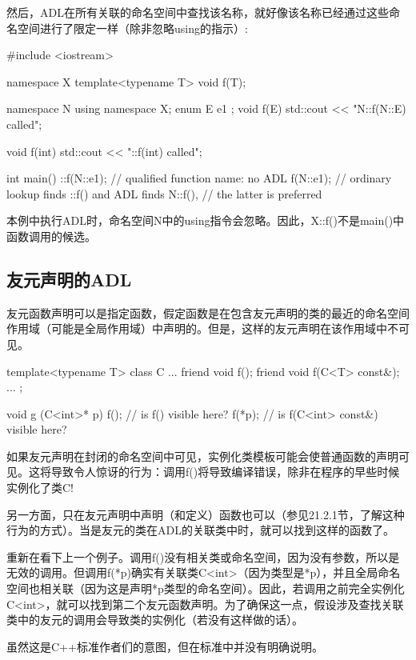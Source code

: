 然后，ADL在所有关联的命名空间中查找该名称，就好像该名称已经通过这些命名空间进行了限定一样（除非忽略using的指示）:

\begin{cpp}
#include <iostream>

namespace X {
	template<typename T> void f(T);
}

namespace N {
	using namespace X;
	enum E { e1 };
	void f(E) {
		std::cout << "N::f(N::E) called\n";
	}
}

void f(int)
{
	std::cout << "::f(int) called\n";
}

int main()
{
	::f(N::e1); // qualified function name: no ADL
	f(N::e1); // ordinary lookup finds ::f() and ADL finds N::f(),
} // the latter is preferred
\end{cpp}

本例中执行ADL时，命名空间N中的using指令会忽略。因此，X::f()不是main()中函数调用的候选。

\subsection{友元声明的ADL}

友元函数声明可以是指定函数，假定函数是在包含友元声明的类的最近的命名空间作用域（可能是全局作用域）中声明的。但是，这样的友元声明在该作用域中不可见。

\begin{cpp}
template<typename T>
class C {
	...
	friend void f();
	friend void f(C<T> const&);
	...
};

void g (C<int>* p)
{
	f(); // is f() visible here?
	f(*p); // is f(C<int> const&) visible here?
}
\end{cpp}

如果友元声明在封闭的命名空间中可见，实例化类模板可能会使普通函数的声明可见。这将导致令人惊讶的行为：调用f()将导致编译错误，除非在程序的早些时候实例化了类C!

另一方面，只在友元声明中声明（和定义）函数也可以（参见21.2.1节，了解这种行为的方式）。当是友元的类在ADL的关联类中时，就可以找到这样的函数了。

重新在看下上一个例子。调用f()没有相关类或命名空间，因为没有参数，所以是无效的调用。但调用f(*p)确实有关联类C<int>（因为类型是*p），并且全局命名空间也相关联（因为这是声明*p类型的命名空间）。因此，若调用之前完全实例化C<int>，就可以找到第二个友元函数声明。为了确保这一点，假设涉及查找关联类中的友元的调用会导致类的实例化（若没有这样做的话）。

\begin{notice}
虽然这是C++标准作者们的意图，但在标准中并没有明确说明。
\end{notice}

